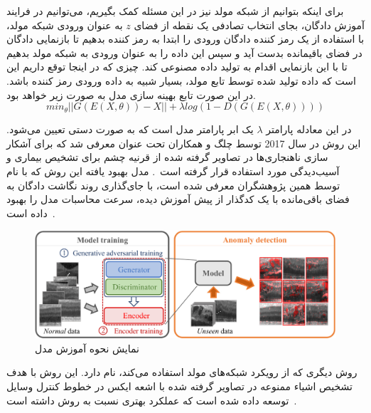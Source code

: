 \documentclass[12pt,a4paper]{report}
\begin{document}
برای اینکه بتوانیم از شبکه مولد نیز در این مسئله کمک بگیریم، می‌توانیم در فرایند آموزش دادگان، بجای انتخاب تصادفی یک نقطه از فضای $z$ به عنوان ورودی شبکه مولد، با استفاده از یک رمز کننده دادگان ورودی را ابتدا به رمز کننده بدهیم تا بازنمایی دادگان در فضای باقیمانده بدست آید و سپس این داده را به عنوان ورودی به شبکه مولد بدهیم تا با این بازنمایی اقدام به تولید داده مصنوعی کند. چیزی که در اینجا توقع داریم این است که داده تولید شده توسط تابع مولد، بسیار شبیه به داده ورودی رمز کننده باشد. در این صورت تابع بهینه سازی مدل به صورت زیر خواهد بود.
\begin{equation}
	min_\theta ||G(E(X, \theta)) - X|| + \lambda log(1-D(G(E(X, \theta))))
\end{equation}

در این معادله پارامتر $\lambda$ یک ابر پارامتر مدل است که به صورت دستی تعیین می‌شود. این روش در سال 2017 توسط چلگ و همکاران تحت عنوان  معرفی شد که برای آشکار سازی ناهنجاری‌ها در تصاویر گرفته شده از قرنیه چشم برای تشخیص بیماری و آسیب‌دیدگی مورد استفاده قرار گرفته است~\cite{10.1007/978-3-319-59050-9_12}. مدل بهبود یافته این روش که با نام  توسط همین پژوهشگران معرفی شده است، با جای‌گذاری روند نگاشت دادگان به فضای باقی‌مانده با یک کدگذار از پیش آموزش دیده، سرعت محاسبات مدل را بهبود داده است~\cite{SCHLEGL201930}.
\begin{figure}[!h]
	\begin{center}
		\includegraphics[width=0.7\linewidth]{./images/figures/anogan.png}
	\end{center}
	\caption{نمایش نحوه آموزش مدل ~\cite{SCHLEGL201930}}
	\label{fig:vae}
	\centering
\end{figure}

روش دیگری که از رویکرد شبکه‌های مولد استفاده می‌کند،  نام دارد. این روش با هدف تشخیص اشیاء ممنوعه در تصاویر گرفته شده با اشعه ایکس در خطوط کنترل وسایل توسعه داده شده است که عملکرد بهتری نسبت به روش داشته است~\cite{akcay2018ganomaly}.
\end{document}
